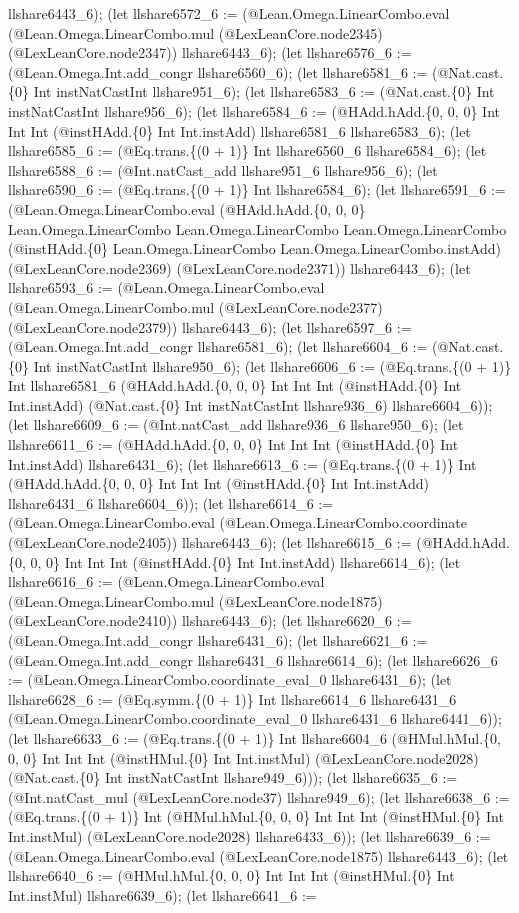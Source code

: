 \documentclass[11pt]{article}
\begin{document}
llshare6443\_6); (let llshare6572\_6 := (@Lean.Omega.LinearCombo.eval (@Lean.Omega.LinearCombo.mul (@LexLeanCore.node2345) (@LexLeanCore.node2347)) llshare6443\_6); (let llshare6576\_6 := (@Lean.Omega.Int.add\_congr llshare6560\_6); (let llshare6581\_6 := (@Nat.cast.\{0\} Int instNatCastInt llshare951\_6); (let llshare6583\_6 := (@Nat.cast.\{0\} Int instNatCastInt llshare956\_6); (let llshare6584\_6 := (@HAdd.hAdd.\{0, 0, 0\} Int Int Int (@instHAdd.\{0\} Int Int.instAdd) llshare6581\_6 llshare6583\_6); (let llshare6585\_6 := (@Eq.trans.\{(0 + 1)\} Int llshare6560\_6 llshare6584\_6); (let llshare6588\_6 := (@Int.natCast\_add llshare951\_6 llshare956\_6); (let llshare6590\_6 := (@Eq.trans.\{(0 + 1)\} Int llshare6584\_6); (let llshare6591\_6 := (@Lean.Omega.LinearCombo.eval (@HAdd.hAdd.\{0, 0, 0\} Lean.Omega.LinearCombo Lean.Omega.LinearCombo Lean.Omega.LinearCombo (@instHAdd.\{0\} Lean.Omega.LinearCombo Lean.Omega.LinearCombo.instAdd) (@LexLeanCore.node2369) (@LexLeanCore.node2371)) llshare6443\_6); (let llshare6593\_6 := (@Lean.Omega.LinearCombo.eval (@Lean.Omega.LinearCombo.mul (@LexLeanCore.node2377) (@LexLeanCore.node2379)) llshare6443\_6); (let llshare6597\_6 := (@Lean.Omega.Int.add\_congr llshare6581\_6); (let llshare6604\_6 := (@Nat.cast.\{0\} Int instNatCastInt llshare950\_6); (let llshare6606\_6 := (@Eq.trans.\{(0 + 1)\} Int llshare6581\_6 (@HAdd.hAdd.\{0, 0, 0\} Int Int Int (@instHAdd.\{0\} Int Int.instAdd) (@Nat.cast.\{0\} Int instNatCastInt llshare936\_6) llshare6604\_6)); (let llshare6609\_6 := (@Int.natCast\_add llshare936\_6 llshare950\_6); (let llshare6611\_6 := (@HAdd.hAdd.\{0, 0, 0\} Int Int Int (@instHAdd.\{0\} Int Int.instAdd) llshare6431\_6); (let llshare6613\_6 := (@Eq.trans.\{(0 + 1)\} Int (@HAdd.hAdd.\{0, 0, 0\} Int Int Int (@instHAdd.\{0\} Int Int.instAdd) llshare6431\_6 llshare6604\_6)); (let llshare6614\_6 := (@Lean.Omega.LinearCombo.eval (@Lean.Omega.LinearCombo.coordinate (@LexLeanCore.node2405)) llshare6443\_6); (let llshare6615\_6 := (@HAdd.hAdd.\{0, 0, 0\} Int Int Int (@instHAdd.\{0\} Int Int.instAdd) llshare6614\_6); (let llshare6616\_6 := (@Lean.Omega.LinearCombo.eval (@Lean.Omega.LinearCombo.mul (@LexLeanCore.node1875) (@LexLeanCore.node2410)) llshare6443\_6); (let llshare6620\_6 := (@Lean.Omega.Int.add\_congr llshare6431\_6); (let llshare6621\_6 := (@Lean.Omega.Int.add\_congr llshare6431\_6 llshare6614\_6); (let llshare6626\_6 := (@Lean.Omega.LinearCombo.coordinate\_eval\_0 llshare6431\_6); (let llshare6628\_6 := (@Eq.symm.\{(0 + 1)\} Int llshare6614\_6 llshare6431\_6 (@Lean.Omega.LinearCombo.coordinate\_eval\_0 llshare6431\_6 llshare6441\_6)); (let llshare6633\_6 := (@Eq.trans.\{(0 + 1)\} Int llshare6604\_6 (@HMul.hMul.\{0, 0, 0\} Int Int Int (@instHMul.\{0\} Int Int.instMul) (@LexLeanCore.node2028) (@Nat.cast.\{0\} Int instNatCastInt llshare949\_6))); (let llshare6635\_6 := (@Int.natCast\_mul (@LexLeanCore.node37) llshare949\_6); (let llshare6638\_6 := (@Eq.trans.\{(0 + 1)\} Int (@HMul.hMul.\{0, 0, 0\} Int Int Int (@instHMul.\{0\} Int Int.instMul) (@LexLeanCore.node2028) llshare6433\_6)); (let llshare6639\_6 := (@Lean.Omega.LinearCombo.eval (@LexLeanCore.node1875) llshare6443\_6); (let llshare6640\_6 := (@HMul.hMul.\{0, 0, 0\} Int Int Int (@instHMul.\{0\} Int Int.instMul) llshare6639\_6); (let llshare6641\_6 := 
\end{document}

